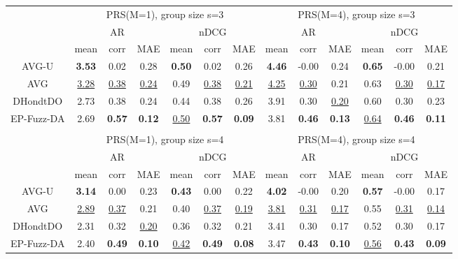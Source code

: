 \begin{tabular}{ c | c c c | c c c || c c c | c c c}

\multicolumn{1}{c}{} & \multicolumn{6}{c}{PRS(M=1), group size s=3} & \multicolumn{6}{c}{PRS(M=4), group size s=3} \\
\multicolumn{1}{c}{} & \multicolumn{3}{c}{AR} & \multicolumn{3}{c}{nDCG} & \multicolumn{3}{c}{AR} & \multicolumn{3}{c}{nDCG} \\
& mean & corr & MAE & mean & corr & MAE & mean & corr & MAE & mean & corr & MAE \\
\hline
AVG-U & \textbf{3.53} & 0.02 & 0.28 & \textbf{0.50} & 0.02 & 0.26 & \textbf{4.46} & -0.00 & 0.24 & \textbf{0.65} & -0.00 & 0.21 \\
AVG & \underline{3.28} & \underline{0.38} & \underline{0.24} & 0.49 & \underline{0.38} & \underline{0.21} & \underline{4.25} & \underline{0.30} & 0.21 & 0.63 & \underline{0.30} & \underline{0.17} \\
DHondtDO & 2.73 & 0.38 & 0.24 & 0.44 & 0.38 & 0.26 & 3.91 & 0.30 & \underline{0.20} & 0.60 & 0.30 & 0.23 \\
EP-Fuzz-DA & 2.69 & \textbf{0.57} & \textbf{0.12} & \underline{0.50} & \textbf{0.57} & \textbf{0.09} & 3.81 & \textbf{0.46} & \textbf{0.13} & \underline{0.64} & \textbf{0.46} & \textbf{0.11} \\

\multicolumn{12}{c}{} \\
\multicolumn{1}{c}{} & \multicolumn{6}{c}{PRS(M=1), group size s=4} & \multicolumn{6}{c}{PRS(M=4), group size s=4} \\
\multicolumn{1}{c}{} & \multicolumn{3}{c}{AR} & \multicolumn{3}{c}{nDCG} & \multicolumn{3}{c}{AR} & \multicolumn{3}{c}{nDCG} \\
& mean & corr & MAE & mean & corr & MAE & mean & corr & MAE & mean & corr & MAE \\
\hline
AVG-U & \textbf{3.14} & 0.00 & 0.23 & \textbf{0.43} & 0.00 & 0.22 & \textbf{4.02} & -0.00 & 0.20 & \textbf{0.57} & -0.00 & 0.17 \\
AVG & \underline{2.89} & \underline{0.37} & 0.21 & 0.40 & \underline{0.37} & \underline{0.19} & \underline{3.81} & \underline{0.31} & \underline{0.17} & 0.55 & \underline{0.31} & \underline{0.14} \\
DHondtDO & 2.31 & 0.32 & \underline{0.20} & 0.36 & 0.32 & 0.21 & 3.41 & 0.30 & 0.17 & 0.52 & 0.30 & 0.17 \\
EP-Fuzz-DA & 2.40 & \textbf{0.49} & \textbf{0.10} & \underline{0.42} & \textbf{0.49} & \textbf{0.08} & 3.47 & \textbf{0.43} & \textbf{0.10} & \underline{0.56} & \textbf{0.43} & \textbf{0.09} \\


\end{tabular}
